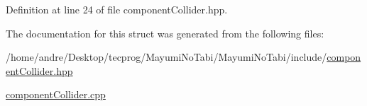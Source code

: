 Definition at line 24 of file component\-Collider.\-hpp.



The documentation for this struct was generated from the following files\-:\begin{DoxyCompactItemize}
\item 
/home/andre/\-Desktop/tecprog/\-Mayumi\-No\-Tabi/\-Mayumi\-No\-Tabi/include/\hyperlink{component_collider_8hpp}{component\-Collider.\-hpp}\item 
\hyperlink{component_collider_8cpp}{component\-Collider.\-cpp}\end{DoxyCompactItemize}
